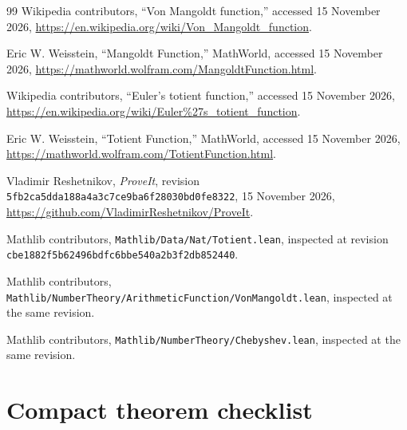 \documentclass[11pt]{article}
\theoremstyle{definition}
\newcommand{\code}[1]{\nolinkurl{#1}}
\begin{document}
\begin{thebibliography}{99}
Wikipedia contributors, ``Von Mangoldt function,'' accessed 15 November 2026,
\url{https://en.wikipedia.org/wiki/Von_Mangoldt_function}.

Eric W. Weisstein, ``Mangoldt Function,'' MathWorld, accessed 15 November 2026,
\url{https://mathworld.wolfram.com/MangoldtFunction.html}.

Wikipedia contributors, ``Euler's totient function,'' accessed 15 November 2026,
\url{https://en.wikipedia.org/wiki/Euler%27s_totient_function}.

Eric W. Weisstein, ``Totient Function,'' MathWorld, accessed 15 November 2026,
\url{https://mathworld.wolfram.com/TotientFunction.html}.

Vladimir Reshetnikov, \emph{ProveIt}, revision
\code{5fb2ca5dda188a4a3c7ce9ba6f28030bd0fe8322}, 15 November 2026,
\url{https://github.com/VladimirReshetnikov/ProveIt}.

Mathlib contributors, \code{Mathlib/Data/Nat/Totient.lean}, inspected at
revision \code{cbe1882f5b62496bdfc6bbe540a2b3f2db852440}.

Mathlib contributors,
\code{Mathlib/NumberTheory/ArithmeticFunction/VonMangoldt.lean}, inspected at
the same revision.

Mathlib contributors, \code{Mathlib/NumberTheory/Chebyshev.lean}, inspected at
the same revision.
\end{thebibliography}

\appendix
\section{Compact theorem checklist}
\end{document}
